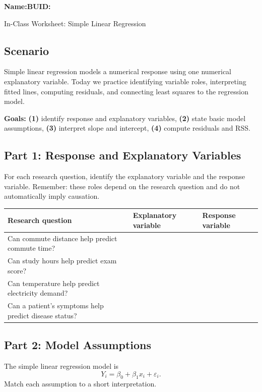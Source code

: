 \documentclass{article}
\newcommand{\blankline}[1]{\underline{\hspace{#1}}}
\begin{document}
\noindent\textbf{Name:}\blankline{2.25in}\hfill\textbf{BUID:}\blankline{1.55in}\newline

\begin{center}
 \Large In-Class Worksheet: Simple Linear Regression
\end{center}

\subsection*{Scenario}
Simple linear regression models a numerical response using one numerical explanatory variable. Today we practice identifying variable roles, interpreting fitted lines, computing residuals, and connecting least squares to the regression model.

\medskip
\noindent\textbf{Goals:} \textbf{(1)} identify response and explanatory variables, \textbf{(2)} state basic model assumptions, \textbf{(3)} interpret slope and intercept, \textbf{(4)} compute residuals and RSS.

\subsection*{Part 1: Response and Explanatory Variables}
For each research question, identify the explanatory variable and the response variable. Remember: these roles depend on the research question and do not automatically imply causation.

\begin{center}
\renewcommand{\arraystretch}{1.45}
\begin{tabularx}{\textwidth}{p{7.3cm}p{4cm}X}
\toprule
\textbf{Research question} & \textbf{Explanatory variable} & \textbf{Response variable} \\
\midrule
Can commute distance help predict commute time? & & \\[1.8em]
Can study hours help predict exam score? & & \\[1.8em]
Can temperature help predict electricity demand? & & \\[1.8em]
Can a patient's symptoms help predict disease status? & & \\
\bottomrule
\end{tabularx}
\end{center}

\subsection*{Part 2: Model Assumptions}
The simple linear regression model is
\[
Y_i = \beta_0 + \beta_1x_i + \varepsilon_i.
\]
Match each assumption to a short interpretation.
\end{document}
